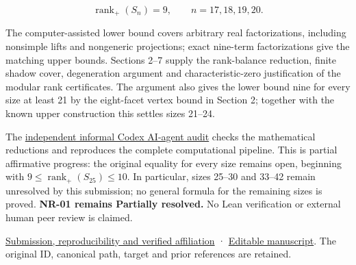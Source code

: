 \documentclass[11pt,a4paper]{article}
\begin{document}
\[\mathop{\mathrm{rank}}\nolimits_+(S_n)=9,\qquad n=17,18,19,20.\]

The computer-assisted lower bound covers arbitrary real factorizations,
including nonsimple lifts and nongeneric projections; exact nine-term
factorizations give the matching upper bounds. Sections 2--7 supply the
rank-balance reduction, finite shadow cover, degeneration argument and
characteristic-zero justification of the modular rank certificates. The
argument also gives the lower bound nine for every size at least 21 by
the eight-facet vertex bound in Section 2; together with the known upper
construction this settles sizes 21--24.

The
\href{https://github.com/ajt60gaibb/OpenProblemsInNLA/blob/main/references/holden-nr01-2026-09-13/independent-review.md}{independent
informal Codex AI-agent audit} checks the mathematical reductions and
reproduces the complete computational pipeline. This is partial
affirmative progress: the original equality for every size remains open,
beginning with \(9\le\mathop{\mathrm{rank}}\nolimits_+(S_{25})\le10\).
In particular, sizes 25--30 and 33--42 remain unresolved by this
submission; no general formula for the remaining sizes is proved.
\textbf{NR-01 remains Partially resolved.} No Lean verification or
external human peer review is claimed.

\href{https://github.com/ajt60gaibb/OpenProblemsInNLA/blob/main/references/holden-nr01-2026-09-13/README.md}{Submission,
reproducibility and verified affiliation} ·
\href{https://github.com/ajt60gaibb/OpenProblemsInNLA/blob/main/references/holden-nr01-2026-09-13/report.tex}{Editable
manuscript}. The original ID, canonical path, target and prior
references are retained.
\end{document}
